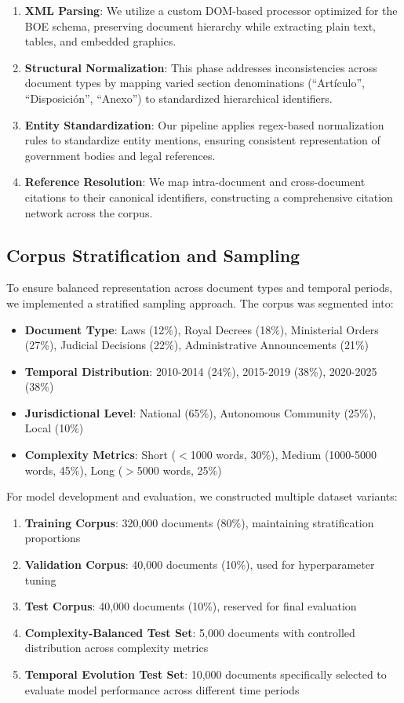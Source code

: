 \documentclass[conference]{IEEEtran}
\begin{document}
\begin{enumerate}
    \item \textbf{XML Parsing}: We utilize a custom DOM-based processor optimized for the BOE schema, preserving document hierarchy while extracting plain text, tables, and embedded graphics.
    \item \textbf{Structural Normalization}: This phase addresses inconsistencies across document types by mapping varied section denominations (``Artículo'', ``Disposición'', ``Anexo'') to standardized hierarchical identifiers.
    \item \textbf{Entity Standardization}: Our pipeline applies regex-based normalization rules to standardize entity mentions, ensuring consistent representation of government bodies and legal references.
    \item \textbf{Reference Resolution}: We map intra-document and cross-document citations to their canonical identifiers, constructing a comprehensive citation network across the corpus.
\end{enumerate}

\subsection{Corpus Stratification and Sampling}
To ensure balanced representation across document types and temporal periods, we implemented a stratified sampling approach. The corpus was segmented into:

\begin{itemize}
    \item \textbf{Document Type}: Laws (12\%), Royal Decrees (18\%), Ministerial Orders (27\%), Judicial Decisions (22\%), Administrative Announcements (21\%)
    \item \textbf{Temporal Distribution}: 2010-2014 (24\%), 2015-2019 (38\%), 2020-2025 (38\%)
    \item \textbf{Jurisdictional Level}: National (65\%), Autonomous Community (25\%), Local (10\%)
    \item \textbf{Complexity Metrics}: Short ($<$1000 words, 30\%), Medium (1000-5000 words, 45\%), Long ($>$5000 words, 25\%)
\end{itemize}

For model development and evaluation, we constructed multiple dataset variants:

\begin{enumerate}
    \item \textbf{Training Corpus}: 320,000 documents (80\%), maintaining stratification proportions
    \item \textbf{Validation Corpus}: 40,000 documents (10\%), used for hyperparameter tuning
    \item \textbf{Test Corpus}: 40,000 documents (10\%), reserved for final evaluation
    \item \textbf{Complexity-Balanced Test Set}: 5,000 documents with controlled distribution across complexity metrics
    \item \textbf{Temporal Evolution Test Set}: 10,000 documents specifically selected to evaluate model performance across different time periods
\end{enumerate}
\end{document}
